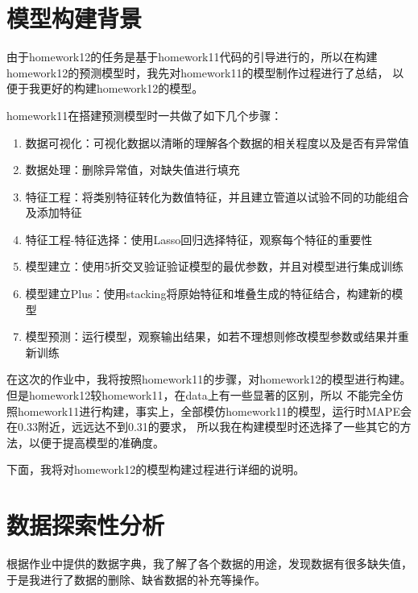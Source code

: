 \documentclass{ctexart}
\begin{document}
\section{模型构建背景}
由于homework12的任务是基于homework11代码的引导进行的，所以在构建homework12的预测模型时，我先对homework11的模型制作过程进行了总结，
以便于我更好的构建homework12的模型。\par
homework11在搭建预测模型时一共做了如下几个步骤：
\begin{enumerate}
    \item 数据可视化：可视化数据以清晰的理解各个数据的相关程度以及是否有异常值
    \item 数据处理：删除异常值，对缺失值进行填充
    \item 特征工程：将类别特征转化为数值特征，并且建立管道以试验不同的功能组合及添加特征
    \item 特征工程-特征选择：使用Lasso回归选择特征，观察每个特征的重要性
    \item 模型建立：使用5折交叉验证验证模型的最优参数，并且对模型进行集成训练
    \item 模型建立Plus：使用stacking将原始特征和堆叠生成的特征结合，构建新的模型
    \item 模型预测：运行模型，观察输出结果，如若不理想则修改模型参数或结果并重新训练
\end{enumerate}
\par
在这次的作业中，我将按照homework11的步骤，对homework12的模型进行构建。但是homework12较homework11，在data上有一些显著的区别，所以
不能完全仿照homework11进行构建，事实上，全部模仿homework11的模型，运行时MAPE会在0.33附近，远远达不到0.31的要求，
所以我在构建模型时还选择了一些其它的方法，以便于提高模型的准确度。\par
下面，我将对homework12的模型构建过程进行详细的说明。

\section{数据探索性分析}
根据作业中提供的数据字典，我了解了各个数据的用途，发现数据有很多缺失值，于是我进行了数据的删除、缺省数据的补充等操作。
\par
\end{document}

